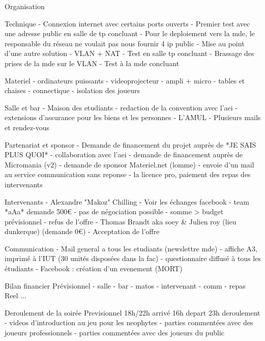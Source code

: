 Organisation

	Technique
		- Connexion internet avec certains ports ouverts
		- Premier test avec une adresse public en salle de tp concluant
		- Pour le deploiement vers la mde, le responsable du réseau ne voulait pas nous fournir 4 ip public
		- Mise au point d'une autre solution
		       - VLAN + NAT
		- Test en salle tp concluant
 		- Brassage des prises de la mde sur le VLAN
		- Test à la mde concluant

	Materiel
		- ordinateurs puissants
		- videoprojecteur
		- ampli + micro
		- tables et chaises
		- connectique
    - isolation des joueurs

	Salle et bar
	      - Maison des etudiants
	      	       - redaction de la convention avec l'aei
		       - extensions d'assurance pour les biens et les personnes
	      - L'AMUL
			- Plusieurs mails et rendez-vous

	Partenariat et sponsor
        - Demande de financement du projet auprès de *JE SAIS PLUS QUOI*
		    - collaboration avec l'aei
        - demande de financement auprès de Micromania (v2)
		    - demande de sponsor Materiel.net (lomme)
		    - envoie d'un mail au service communication sans reponse
		    - la licence pro, paiement des repas des intervenants

	Intervenants
    - Alexandre "Makoz" Chilling
      - Voir les échanges facebook
		- team *aAa* demande 500€
                    - pas de négociation possible
                    - somme > budget prévisionnel
                    - refus de l'offre
    - Thomas Brandt aka soey & Julien roy (lieu dunkerque) (demande 0€)
        - Acceptation de l'offre

        Communication
                - Mail general a tous les etudiants (newslettre mde)
                - affiche A3, imprimé à l'IUT (30 unités disposées dans la fac)
                - questionnaire diffusé à tous les étudiants
                - Facebook : création d'un evenement (MORT)

        Bilan financier
                Prévisionnel
                    - salle
                    - bar
                    - matos
                    - intervenant
                    - comm
                    - repas
                Reel
                   ...

        Deroulement de la soirée
                Previsionnel
                    18h/22h
                    arrivé 16h
                    depart 23h
                    deroulement
                        - videos d'introduction au jeu pour les neophytes
                        - parties commentées avec des joueurs professionnels
                        - parties commentées avec des joueurs du public

